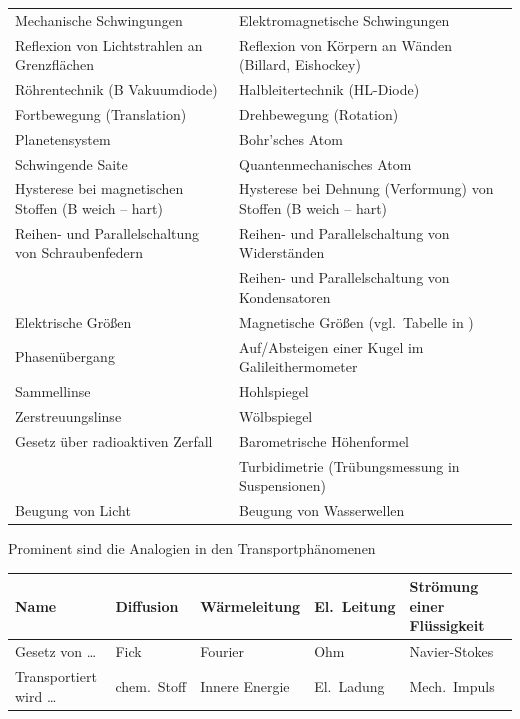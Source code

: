 \begin{center} \small
\begin{tabular}{ p{5cm} @{\q --- \q } p{5cm} }
Mechanische Schwingungen & Elektromagnetische Schwingungen \\

Reflexion von Lichtstrahlen an Grenzfl\"{a}chen
& Reflexion von K\"{o}rpern an W\"{a}nden  (Billard, Eishockey) \\

R\"{o}hrentechnik (B Vakuumdiode) & Halbleitertechnik (HL-Diode) \\

Fortbewegung (Translation) & Drehbewegung  (Rotation) \\

Planetensystem           & Bohr'sches Atom  \\

Schwingende Saite & Quantenmechanisches Atom \\

Hysterese bei magnetischen Stoffen (B weich -- hart) &
Hysterese bei Dehnung (Verformung) von Stoffen (B weich -- hart) \\

Reihen- und Parallelschaltung von Schraubenfedern &
Reihen- und Parallelschaltung von Widerst\"{a}nden \\
& Reihen- und Parallelschaltung von Kondensatoren \\

Elektrische Gr\"{o}{\ss}en & Magnetische Gr\"{o}{\ss}en
                      (vgl.\ Tabelle in \cite{Stoecker}) \\

Phasen\"{u}bergang & Auf/Absteigen einer Kugel im Galileithermometer \\

Sammellinse & Hohlspiegel \\
Zerstreuungslinse & W\"{o}lbspiegel \\
Gesetz \"{u}ber radioaktiven Zerfall &
Barometrische H\"{o}henformel \\
& Turbidimetrie (Tr\"{u}bungsmessung in Suspensionen) \\

Beugung von Licht & Beugung von Wasserwellen
\end{tabular}
\end{center}

\bip
Prominent sind die Analogien in den Transportph\"{a}nomenen

\bip
\begin{center} \scriptsize
\begin{tabular}{ |l || *{4}{l|}}
\hline
Name
&  Diffusion
&  W\"{a}rmeleitung
&  El.\ Leitung
&  Str\"{o}mung einer Fl\"{u}ssigkeit
\\ \hline
Gesetz von \dots
&  Fick
&  Fourier
&  Ohm
&  Navier-Stokes
\\ \hline
Transportiert wird \dots
&  chem.\ Stoff
&  Innere Energie
&  El.\ Ladung
&  Mech.\ Impuls
\\ \hline
\end{tabular}
\end{center}

